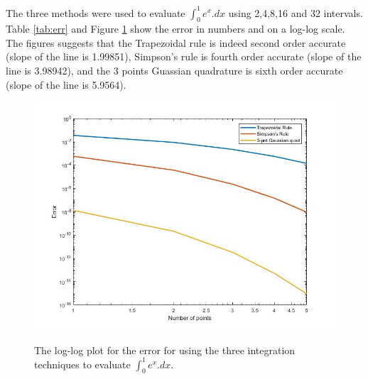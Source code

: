 The three methods were used to evaluate $\int^{1}_{0} e^{x}.dx$ using 2,4,8,16 and 32 intervals. Table \ref{tab:err} and Figure \ref{fig:p3_err_fig} show the error in numbers and on a log-log scale. The figures suggests that the Trapezoidal rule is indeed second order accurate (slope of the line is 1.99851), Simpson's rule is fourth order accurate (slope of the line is 3.98942), and the 3 points Guassian quadrature is sixth order accurate (slope of the line is 5.9564).


\begin{figure}[H]
 \centering  
   {\includegraphics[width=0.7\linewidth]{fig/prob3.jpg}}   
  \caption{The log-log plot for the error for using the three integration techniques to evaluate $\int^{1}_{0} e^{x}.dx$. }
   \label{fig:p3_err_fig}
\end{figure} 
